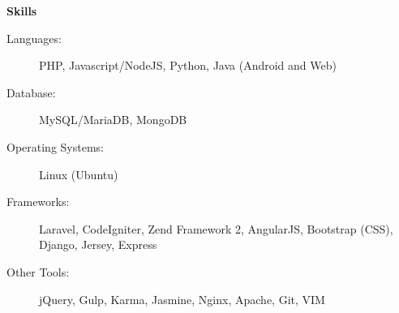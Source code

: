 \documentclass[letterpaper,11pt]{article}
\newcommand{\resheading}[1]{{\large \colorbox{mygrey}{\begin{minipage}{\textwidth}{\textbf{#1 \vphantom{p\^{E}}}}\end{minipage}}}}
\begin{document}
\resheading{Skills}

\begin{description}
\item[Languages:]
PHP, Javascript/NodeJS, Python, Java (Android and Web)
\item[Database:]
MySQL/MariaDB, MongoDB
\item[Operating Systems:]
Linux (Ubuntu)
\item[Frameworks:]
Laravel, CodeIgniter, Zend Framework 2, AngularJS, Bootstrap (CSS), Django, Jersey, Express
\item[Other Tools:]
jQuery, Gulp, Karma, Jasmine, Nginx, Apache, Git, VIM
\end{description}

\pagebreak
\end{document}
